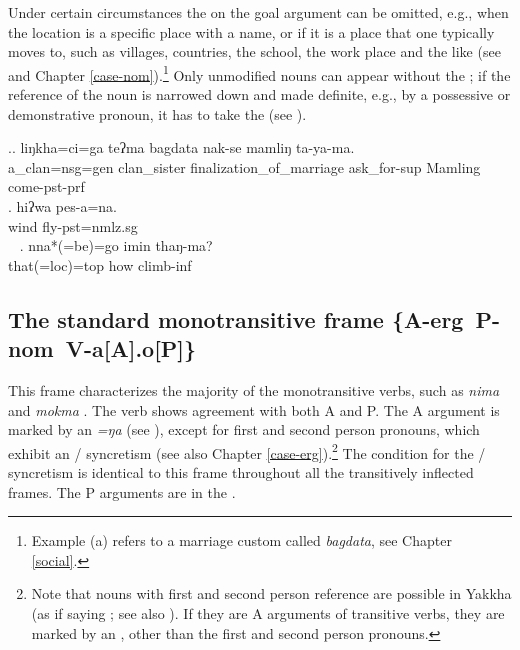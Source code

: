 Under certain circumstances the  on the goal argument can be omitted, e.g., when the location is a specific place with a name, or if it is a place that one typically moves to, such as villages, countries, the school, the work place and the like (see \Next and Chapter \ref{case-nom}).\footnote{Example (a) refers to a marriage custom called \emph{bagdata}, see Chapter \ref{social}.}  Only unmodified nouns can appear without the ; if the reference of the noun is narrowed down and made definite, e.g., by a possessive or demonstrative pronoun, it has to take the   (see \Next[c]).   

\ex.\ag. liŋkha=ci=ga teʔma  bagdata nak-se mamliŋ ta-ya-ma.\\
	a\_clan{\sc =nsg=gen} clan\_sister finalization\_of\_marriage ask\_for{\sc -sup} Mamling  come{\sc [3sg]-pst-prf}\\
	 
\bg. hiʔwa pes-a=na.\\
wind fly{\sc [3sg]-pst=nmlz.sg}\\\
 
\bg. nna*(=be)=go imin thaŋ-ma?\\
that{\sc *(=loc)=top} how climb{\sc -inf} \\
 



\subsection[The standard monotransitive frame]{The standard monotransitive frame %
\mbox{\{A-{\sc erg} P-{\sc nom} V-a[A].o[P]\}}}
\label{stand-tr}


\noindent
This frame characterizes the majority of the monotransitive verbs, such as \emph{nima}  and  \emph{mokma} . The verb shows agreement with both A and P. The A argument is  marked by an   \emph{=ŋa} (see \Next[a]), except for first and second person pronouns, which exhibit an / syncretism (see also Chapter \ref{case-erg}).\footnote{Note that nouns with first and second person reference are possible in Yakkha (as if saying ; see also ). If they are A arguments of transitive verbs, they are marked by an , other than the first and second person pronouns.} The condition for the / syncretism is identical to this frame throughout all the transitively inflected frames. The P arguments are in the  . 


